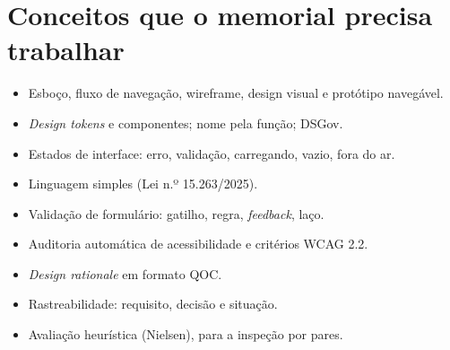 \documentclass[11pt,a4paper]{article}
\begin{document}
\section{Conceitos que o memorial precisa trabalhar}

\begin{itemize}[leftmargin=1.2em,itemsep=0.15em]
  \item Esboço, fluxo de navegação, wireframe, design visual e protótipo navegável.
  \item \textit{Design tokens} e componentes; nome pela função; DSGov.
  \item Estados de interface: erro, validação, carregando, vazio, fora do ar.
  \item Linguagem simples (Lei n.º 15.263/2025).
  \item Validação de formulário: gatilho, regra, \textit{feedback}, laço.
  \item Auditoria automática de acessibilidade e critérios WCAG 2.2.
  \item \textit{Design rationale} em formato QOC.
  \item Rastreabilidade: requisito, decisão e situação.
  \item Avaliação heurística (Nielsen), para a inspeção por pares.
\end{itemize}
\end{document}
